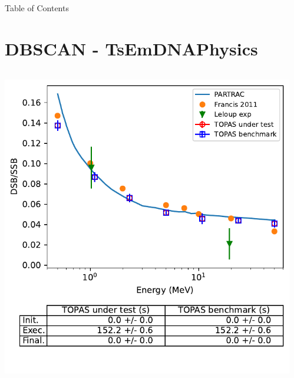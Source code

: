 \documentclass[aspectratio=1610]{beamer}
\title{\SUTname}
\subtitle{Regression testing (cf.\ \benchmarkname)}
\author{Jos\'e Ramos-M\'endez, Naoki D. Kondo, and Thongchai A.M. Masilela}
\institute{University of California San Francisco}
\date{\today}
\begin{document}
\frame{\titlepage}


\begin{frame}[allowframebreaks]{Table of Contents}
  \tableofcontents[sections={1-12}]
    \framebreak
  \tableofcontents[sections={13-}]
\end{frame}

\section{DBSCAN - TsEmDNAPhysics}

\begin{frame}{\secname}
 \begin{columns}
  \begin{column}{0.4\linewidth}
   \includegraphics[width=1.1\textwidth]{./DBSCAN/DBSCAN2_TsEmDNAPhysics}
  \end{column}
  \begin{column}{0.6\linewidth} 

\end{column}
\end{columns}
\end{frame}
\end{document}

